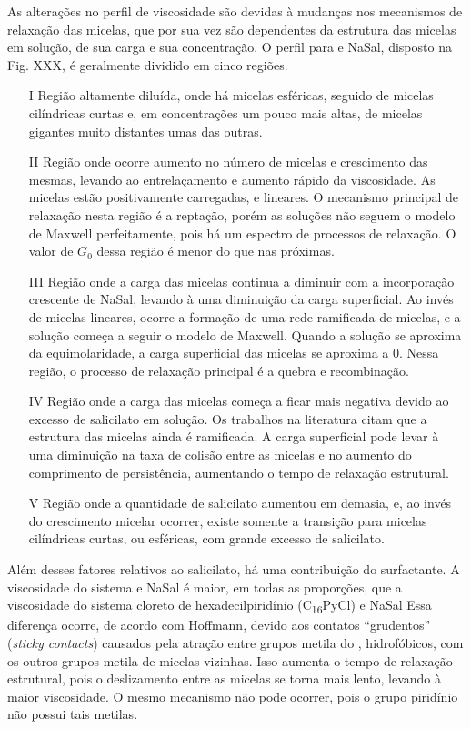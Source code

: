 		As alterações no perfil de viscosidade são devidas à mudanças nos mecanismos de relaxação das micelas, que por sua vez são dependentes da estrutura das micelas em solução, de sua carga e sua concentração. O perfil para \CTAB{} e NaSal, disposto na Fig. XXX, é geralmente dividido em cinco regiões.
		
		\begin{enumerate}
			\item[I] Região altamente diluída, onde há micelas esféricas, seguido de micelas cilíndricas curtas e, em concentrações um pouco mais altas, de micelas gigantes muito distantes umas das outras.
			\item[II] Região onde ocorre aumento no número de micelas e crescimento das mesmas, levando ao entrelaçamento e aumento rápido da viscosidade. As micelas estão positivamente carregadas, e lineares. O mecanismo principal de relaxação nesta região é a reptação, porém as soluções não seguem o modelo de Maxwell perfeitamente, pois há um espectro de processos de relaxação. %
			 O valor de \(G_0\) dessa região é menor do que nas próximas. %
			\item[III] Região onde a carga das micelas continua a diminuir com a incorporação crescente de NaSal, levando à uma diminuição da carga superficial. Ao invés de micelas lineares, ocorre a formação de uma rede ramificada de micelas, e a solução começa a seguir o modelo de Maxwell. Quando a solução se aproxima da equimolaridade, a carga superficial das micelas se aproxima a 0. Nessa região, o processo de relaxação principal é a quebra e recombinação.
			\item[IV] Região onde a carga das micelas começa a ficar mais negativa devido ao excesso de salicilato em solução. Os trabalhos na literatura citam que a estrutura das micelas ainda é ramificada. A carga superficial pode levar à uma diminuição na taxa de colisão entre as micelas e no aumento do comprimento de persistência, aumentando o tempo de relaxação estrutural.
			\item[V] Região onde a quantidade de salicilato aumentou em demasia, e, ao invés do crescimento micelar ocorrer, existe somente a transição para micelas cilíndricas curtas, ou esféricas, com grande excesso de salicilato.
		\end{enumerate}
		
		
		Além desses fatores relativos ao salicilato, há uma contribuição do surfactante. A viscosidade do sistema \CTAB{} e NaSal é maior, em todas as proporções, que a viscosidade do sistema cloreto de hexadecilpiridínio (C\textsubscript{16}PyCl) e NaSal %
		Essa diferença ocorre, de acordo com Hoffmann, %
		devido aos contatos ``grudentos'' (\emph{sticky contacts}) causados pela atração entre grupos metila do \CTAB, hidrofóbicos, com os outros grupos metila de micelas vizinhas. Isso aumenta o tempo de relaxação estrutural, pois o deslizamento entre as micelas se torna mais lento, levando à maior viscosidade. O mesmo mecanismo não pode ocorrer, pois o grupo piridínio não possui tais metilas. 
		
